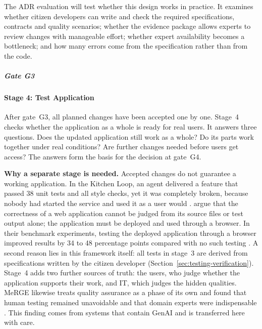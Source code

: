\documentclass[10pt,a4paper]{article}
\begin{document}
The ADR evaluation will test whether this design works in practice. It
examines whether citizen developers can write and check the required
specifications, contracts and quality scenarios; whether the evidence package
allows experts to review changes with manageable effort; whether expert
availability becomes a bottleneck; and how many errors come from the
specification rather than from the code.

\subparagraph{Gate G3}

\paragraph{Stage 4: Test Application}
\label{sec:test-application}

After gate~G3, all planned changes have been accepted one by one. Stage~4
checks whether the application as a whole is ready for real users. It answers
three questions. Does the updated application still work as a whole? Do its
parts work together under real conditions? Are further changes needed before
users get access? The answers form the basis for the decision at gate~G4.

\textbf{Why a separate stage is needed.} Accepted changes do not guarantee a
working application. In the Kitchen Loop, an agent delivered a feature that
passed 38 unit tests and all style checks, yet it was completely broken,
because nobody had started the service and used it as a user would
\parencite{TODO-kitchenloop}. \textcite{TODO-tddev} argue that the correctness
of a web application cannot be judged from its source files or test output
alone; the application must be deployed and used through a browser. In their
benchmark experiments, testing the deployed application through a browser
improved results by 34 to 48 percentage points compared with no such testing
\parencite{TODO-tddev}. A second reason lies in this framework itself: all
tests in stage~3 are derived from specifications written by the citizen
developer (Section~\ref{sec:testing-verification}). Stage~4 adds two further
sources of truth: the users, who judge whether the application supports their
work, and IT, which judges the hidden qualities. MeRGE likewise treats quality
assurance as a phase of its own and found that human testing remained
unavoidable and that domain experts were indispensable \parencite{fetzer2026}.
This finding comes from systems that contain GenAI and is transferred here
with care.
\end{document}
